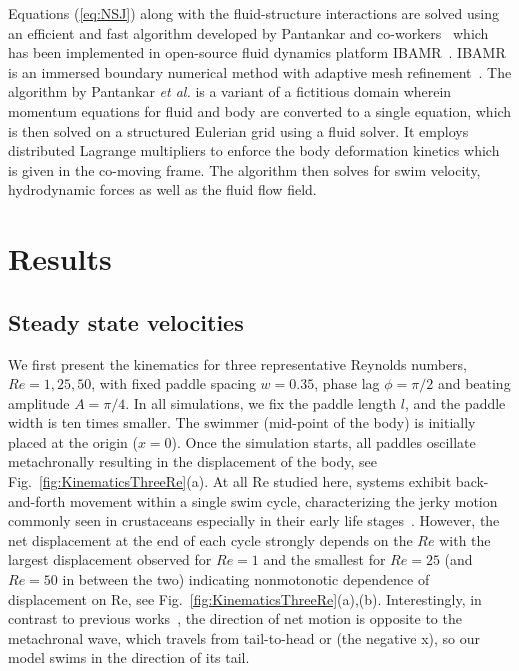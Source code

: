 \documentclass[%
 onecolumn,
superscriptaddress,
 amsmath,amssymb,
 aps,
longbibliography
]{revtex4-2}
\begin{document}
Equations (\ref{eq:NSJ}) along with the fluid-structure interactions are solved using an efficient and fast algorithm developed by Pantankar and co-workers~\cite{Shirgaonkar2009ANewMathematical} which has been implemented in open-source fluid dynamics platform IBAMR~\cite{Bhalla2013AUnified}. IBAMR is an immersed boundary numerical method with adaptive mesh refinement~\cite{griffith2007adaptive}. The algorithm by Pantankar \textit{et al.} is a variant of a fictitious domain wherein momentum equations for fluid and body are converted to a single equation, which is then solved on a structured Eulerian grid using a fluid solver. It employs distributed Lagrange multipliers to enforce the body deformation kinetics which is given in the co-moving frame. The algorithm then solves for swim velocity, hydrodynamic forces as well as the fluid flow field.

\section{Results}
\subsection{Steady state velocities}

We first present the kinematics for three representative Reynolds numbers, $Re =1, 25, 50$, with fixed paddle spacing $w = 0.35$, phase lag $\phi = \pi / 2$ and beating amplitude $A = \pi / 4$. In all simulations, we fix the paddle length $l$, and the paddle width is ten times smaller.
The swimmer (mid-point of the body) is initially placed at the origin ($x = 0$). Once the simulation starts, all paddles oscillate metachronally resulting in the displacement of the body, see Fig.~\ref{fig:KinematicsThreeRe}(a). At all Re studied here, systems exhibit back-and-forth movement within a single swim cycle, characterizing the jerky motion commonly seen in crustaceans especially in their early life stages~\cite{Williams1994Locomotion, Gauld1959Swimming}. However, the net displacement at the end of each cycle strongly depends on the $Re$ with the largest displacement observed for $Re = 1$ and the smallest for $Re = 25$ (and $Re = 50$ in between the two) indicating nonmotonotic dependence of displacement on Re, see Fig.~\ref{fig:KinematicsThreeRe}(a),(b). Interestingly, in contrast to previous works~\cite{Macmillan1981Coordination, Takagi2015Swimming, Kohlhage1994AnAnalysis}, the direction of net motion is opposite to the metachronal wave, which travels from tail-to-head or (the negative x), so our model swims in the direction of its tail.
\end{document}
